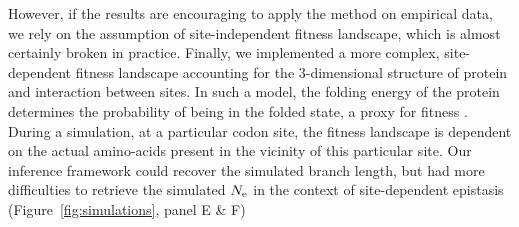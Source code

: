 However, if the results are encouraging to apply the method on empirical data, we rely on the assumption of site-independent fitness landscape, which is almost certainly broken in practice.
Finally, we implemented a more complex, site-dependent fitness landscape accounting for the $3$-dimensional structure of protein and interaction between sites.
In such a model, the folding energy of the protein determines the probability of being in the folded state, a proxy for fitness \citep{Goldstein2017}.
During a simulation, at a particular \gls{codon} site, the fitness landscape is dependent on the actual amino-acids present in the vicinity of this particular site.
Our inference framework could recover the simulated branch length, but had more difficulties to retrieve the simulated $N_{\mathrm{e}}$ in the context of site-dependent epistasis (Figure~\ref{fig:simulations}, panel E \& F)

